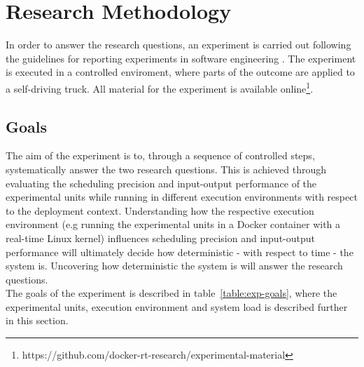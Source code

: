 \iffalse  \fi
\chapter{Research Methodology}\label{section:methodology}

In order to answer the research questions, an experiment is carried out following the guidelines for reporting experiments in software engineering \cite{Andreas}. The experiment is executed in a controlled enviroment, where parts of the outcome are applied to a self-driving truck. All material for the experiment is available online\footnote{https://github.com/docker-rt-research/experimental-material}. 


\section{Goals}
The aim of the experiment is to, through a sequence of controlled steps, systematically answer the two research questions. This is achieved through evaluating the scheduling precision and input-output performance of the experimental units while running in different execution environments with respect to the deployment context. Understanding how the respective execution environment (e.g running the experimental units in a Docker container with a real-time Linux kernel) influences scheduling precision and input-output performance will ultimately decide how deterministic - with respect to time - the system is. Uncovering how deterministic the system is will answer the research questions. \\

The goals of the experiment is described in table~\ref{table:exp-goals}, where the experimental units, execution environment and system load is described further in this section. 

